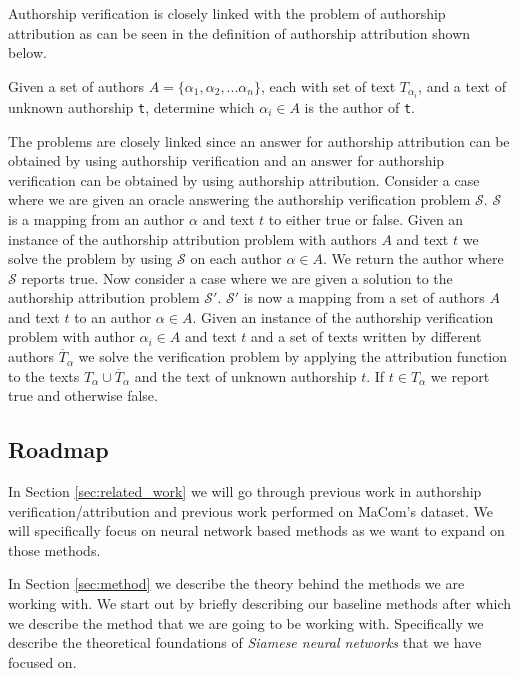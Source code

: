 Authorship verification is closely linked with the problem of authorship
attribution as can be seen in the definition of authorship attribution shown
below.

\begin{definition}

    Given a set of authors $A = \{\alpha_1, \alpha_2,...\alpha_n\}$, each with
    set of text $T_{\alpha_i}$, and a text of unknown authorship \texttt{t},
    determine which $\alpha_i \in A$ is the author of \texttt{t}.

\end{definition}

The problems are closely linked since an answer for authorship attribution
can be obtained by using authorship verification and an answer for authorship
verification can be obtained by using authorship attribution. Consider a case
where we are given an oracle answering the authorship verification problem
$\mathcal{S}$. $\mathcal{S}$ is a mapping from an author $\alpha$ and text $t$
to either true or false. Given an instance of the authorship attribution problem
with authors $A$ and text $t$ we solve the problem by using $\mathcal{S}$ on
each author $\alpha \in A$. We return the author where $\mathcal{S}$ reports
true. Now consider a case where we are given a solution to the authorship
attribution problem $\mathcal{S}'$. $\mathcal{S}'$ is now a mapping from a set
of authors $A$ and text $t$ to an author $\alpha \in A$. Given an instance of
the authorship verification problem with author $\alpha_i \in A$ and text $t$
and a set of texts written by different authors $\overline{T}_{\alpha}$ we solve
the verification problem by applying the attribution function to the texts
$T_{\alpha} \cup \overline{T}_{\alpha}$ and the text of unknown authorship $t$.
If $t \in T_{\alpha}$ we report true and otherwise false.


\subsection{Roadmap}

In Section \ref{sec:related_work} we will go through previous work in authorship
verification/attribution and previous work performed on MaCom's dataset. We will
specifically focus on neural network based methods as we want to expand on those
methods.

In Section \ref{sec:method} we describe the theory behind the methods we are
working with. We start out by briefly describing our baseline methods after
which we describe the method that we are going to be working with. Specifically
we describe the theoretical foundations of \textit{Siamese neural networks} that
we have focused on.

